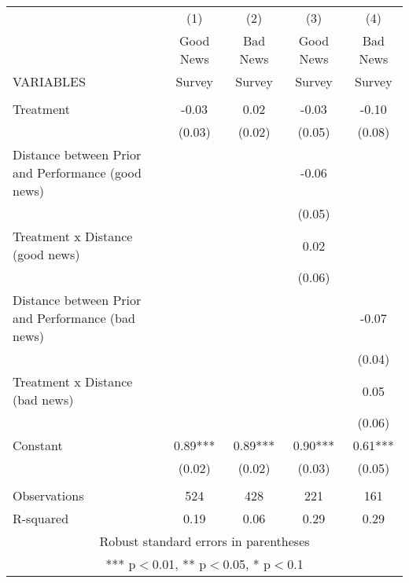 \begin{tabular}{lcccc} \hline
 & (1) & (2) & (3) & (4) \\
 & Good News & Bad News & Good News & Bad News \\
VARIABLES & Survey & Survey & Survey & Survey \\ \hline
 &  &  &  &  \\
Treatment & -0.03 & 0.02 & -0.03 & -0.10 \\
 & (0.03) & (0.02) & (0.05) & (0.08) \\
Distance between Prior and Performance (good news) &  &  & -0.06 &  \\
 &  &  & (0.05) &  \\
Treatment x Distance (good news) &  &  & 0.02 &  \\
 &  &  & (0.06) &  \\
Distance between Prior and Performance (bad news) &  &  &  & -0.07 \\
 &  &  &  & (0.04) \\
Treatment x Distance (bad news) &  &  &  & 0.05 \\
 &  &  &  & (0.06) \\
Constant & 0.89*** & 0.89*** & 0.90*** & 0.61*** \\
 & (0.02) & (0.02) & (0.03) & (0.05) \\
 &  &  &  &  \\
Observations & 524 & 428 & 221 & 161 \\
 R-squared & 0.19 & 0.06 & 0.29 & 0.29 \\ \hline
\multicolumn{5}{c}{ Robust standard errors in parentheses} \\
\multicolumn{5}{c}{ *** p$<$0.01, ** p$<$0.05, * p$<$0.1} \\
\end{tabular}
